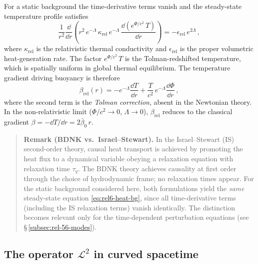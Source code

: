 For a static background the time-derivative terms vanish and the
steady-state temperature profile satisfies
\begin{equation}
  \frac{1}{r^{2}}\frac{\dd}{\dd r}\!\left(
    r^{2}\,e^{-\Lambda}\,\kappa_{\mathrm{rel}}
    \,e^{-\Lambda}\,\frac{\dd(e^{\Phi/c^{2}}\,T)}{\dd r}
  \right)
  = -\epsilon_{\mathrm{rel}}\,e^{2\Lambda} \,,
  \label{eq:rel6-heat-bg}
\end{equation}
where $\kappa_{\mathrm{rel}}$ is the relativistic thermal conductivity
and $\epsilon_{\mathrm{rel}}$ is the proper volumetric heat-generation
rate.  The factor $e^{\Phi/c^{2}}\,T$ is the Tolman-redshifted
temperature, which is spatially uniform in global thermal equilibrium.
The temperature gradient driving buoyancy is therefore
\begin{equation}
  \beta_{\mathrm{rel}}(r)
  = -e^{-\Lambda}\frac{\dd T}{\dd r}
    + \frac{T}{c^{2}}\,e^{-\Lambda}\frac{\dd\Phi}{\dd r} \,,
  \label{eq:rel6-beta}
\end{equation}
where the second term is the \emph{Tolman correction}, absent in the
Newtonian theory.  In the non-relativistic limit
($\Phi/c^{2} \to 0$, $\Lambda \to 0$), $\beta_{\mathrm{rel}}$
reduces to the classical gradient
$\beta = -\dd T/\dd r = 2\bar{\beta}_{0}\,r$.

\begin{quote}
\textbf{Remark (BDNK vs.\ Israel--Stewart).}
In the Israel--Stewart (IS) second-order theory, causal heat transport is
achieved by promoting the heat flux to a dynamical variable obeying a
relaxation equation with relaxation time $\tau_{q}$.  The BDNK theory
achieves causality at first order through the choice of hydrodynamic frame;
no relaxation times appear.  For the static background considered here,
both formulations yield the \emph{same} steady-state equation
\eqref{eq:rel6-heat-bg}, since all time-derivative terms (including the IS
relaxation terms) vanish identically.  The distinction becomes relevant only
for the time-dependent perturbation equations (see
\S\,\ref{subsec:rel-56-modes}).
\end{quote}

\subsection{The operator $\mathscr{L}^{2}$ in curved spacetime}
\label{subsec:rel-56-L2}

